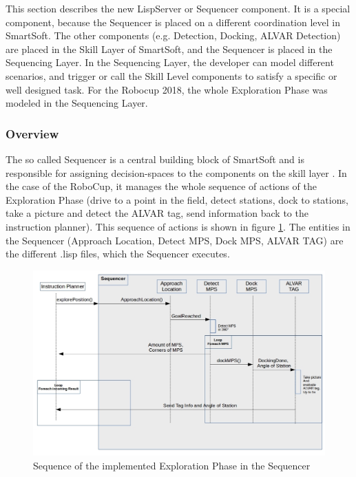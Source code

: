 This section describes the new LispServer or Sequencer component. It is a special component, because the Sequencer is placed on a different coordination level in SmartSoft. The other components (e.g. Detection, Docking, ALVAR Detection) are placed in the Skill Layer of SmartSoft, and the Sequencer is placed in the Sequencing Layer. In the Sequencing Layer, the developer can model different scenarios, and trigger or call the Skill Level components to satisfy a specific or well designed task. 
For the Robocup 2018, the whole Exploration Phase was modeled in the Sequencing Layer.

\subsubsection{Overview}
\label{sec:sequencer_overview}
The so called Sequencer is a central building block of SmartSoft and is responsible for assigning decision-spaces to the components on the skill layer \cite{SmartSoftManual}. In the case of the RoboCup, it manages the whole sequence of actions of the Exploration Phase (drive to a point in the field, detect stations, dock to stations, take a picture and detect the ALVAR tag, send information back to the instruction planner). This sequence of actions is shown in figure \ref{fig:sequ_overview}.
The entities in the Sequencer (Approach Location, Detect MPS, Dock MPS, ALVAR TAG) are the different .lisp files, which the Sequencer executes.

\begin{figure}[h]
\centering
\includegraphics[scale=0.5]{pic/sequenceSequencer.jpg}
\caption{Sequence of the implemented Exploration Phase in the Sequencer}
\label{fig:sequ_overview}
\end{figure}


